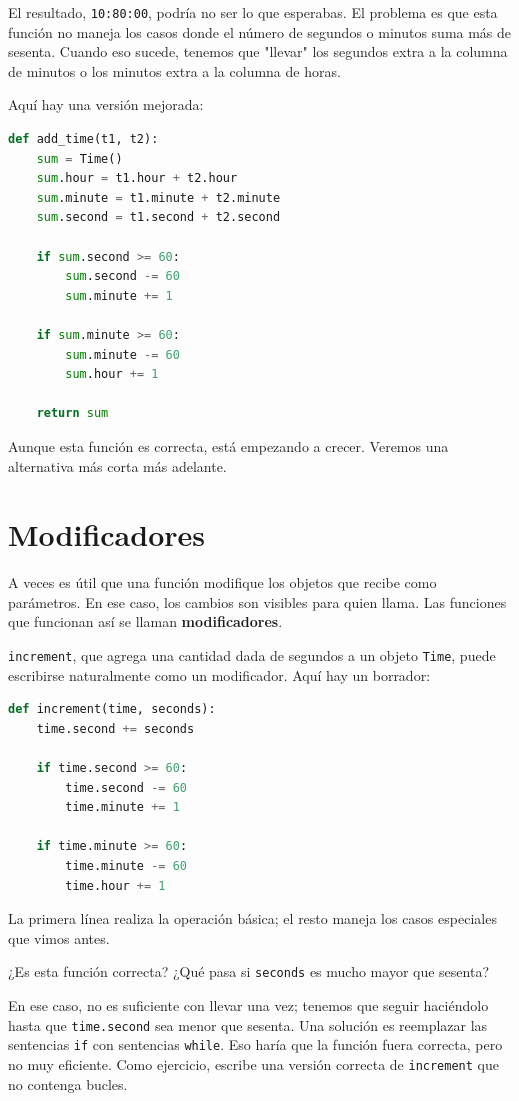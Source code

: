 El resultado, \texttt{10:80:00}, podría no ser lo que esperabas. El problema es que esta función no maneja los casos donde el número de segundos o minutos suma más de sesenta. Cuando eso sucede, tenemos que "llevar" los segundos extra a la columna de minutos o los minutos extra a la columna de horas.

Aquí hay una versión mejorada:

\begin{lstlisting}[language=Python]
def add_time(t1, t2):
    sum = Time()
    sum.hour = t1.hour + t2.hour
    sum.minute = t1.minute + t2.minute
    sum.second = t1.second + t2.second

    if sum.second >= 60:
        sum.second -= 60
        sum.minute += 1

    if sum.minute >= 60:
        sum.minute -= 60
        sum.hour += 1

    return sum
\end{lstlisting}

Aunque esta función es correcta, está empezando a crecer. Veremos una alternativa más corta más adelante.

\section{Modificadores}

A veces es útil que una función modifique los objetos que recibe como parámetros. En ese caso, los cambios son visibles para quien llama. Las funciones que funcionan así se llaman \textbf{modificadores}.

\texttt{increment}, que agrega una cantidad dada de segundos a un objeto \texttt{Time}, puede escribirse naturalmente como un modificador. Aquí hay un borrador:

\begin{lstlisting}[language=Python]
def increment(time, seconds):
    time.second += seconds

    if time.second >= 60:
        time.second -= 60
        time.minute += 1

    if time.minute >= 60:
        time.minute -= 60
        time.hour += 1
\end{lstlisting}

La primera línea realiza la operación básica; el resto maneja los casos especiales que vimos antes.

¿Es esta función correcta? ¿Qué pasa si \texttt{seconds} es mucho mayor que sesenta?

En ese caso, no es suficiente con llevar una vez; tenemos que seguir haciéndolo hasta que \texttt{time.second} sea menor que sesenta. Una solución es reemplazar las sentencias \texttt{if} con sentencias \texttt{while}. Eso haría que la función fuera correcta, pero no muy eficiente. Como ejercicio, escribe una versión correcta de \texttt{increment} que no contenga bucles.

